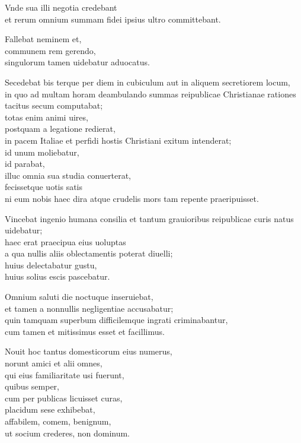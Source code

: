 \documentclass[a5paper,twoside]{article}
\begin{document}
Vnde sua illi negotia credebant \\
et rerum omnium summam fidei ipsius ultro committebant. 

Fallebat neminem et, \\
communem rem gerendo, \\
singulorum tamen uidebatur aduocatus. 

Secedebat bis terque per diem in cubiculum aut in aliquem secretiorem locum, \\
in quo ad multam horam deambulando summas reipublicae Christianae rationes tacitus secum computabat; \\
totas enim animi uires, \\
postquam a legatione redierat, \\
in pacem Italiae et perfidi hostis Christiani exitum intenderat; \\
id unum moliebatur, \\
id parabat, \\
illuc omnia sua studia conuerterat, \\
fecissetque uotis satis \\
ni eum nobis haec dira atque crudelis mors tam repente praeripuisset. 

Vincebat ingenio humana consilia et tantum grauioribus reipublicae curis natus uidebatur; \\
haec erat praecipua eius uoluptas \\
a qua nullis aliis oblectamentis poterat diuelli; \\
huius delectabatur gustu, \\
huius solius escis pascebatur. 

Omnium saluti die noctuque inseruiebat, \\
et tamen a nonnullis negligentiae accusabatur; \\
quin tamquam superbum difficilemque ingrati criminabantur, \\
cum tamen et mitissimus esset et facillimus. 

Nouit hoc tantus domesticorum eius numerus, \\
norunt amici et alii omnes, \\
qui eius familiaritate usi fuerunt, \\
quibus semper, \\
cum per publicas licuisset curas, \\
placidum sese exhibebat, \\
affabilem, comem, benignum, \\
ut socium crederes, non dominum.
\end{document}
